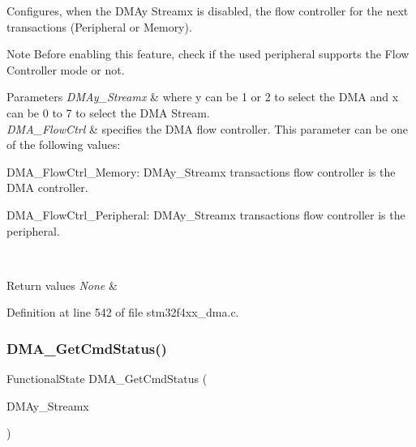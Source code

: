 Configures, when the D\+M\+Ay Streamx is disabled, the flow controller for the next transactions (Peripheral or Memory). 

\begin{DoxyNote}{Note}
Before enabling this feature, check if the used peripheral supports the Flow Controller mode or not.
\end{DoxyNote}

\begin{DoxyParams}{Parameters}
{\em D\+M\+Ay\+\_\+\+Streamx} & where y can be 1 or 2 to select the D\+MA and x can be 0 to 7 to select the D\+MA Stream. \\
\hline
{\em D\+M\+A\+\_\+\+Flow\+Ctrl} & specifies the D\+MA flow controller. This parameter can be one of the following values\+: \begin{DoxyItemize}
\item D\+M\+A\+\_\+\+Flow\+Ctrl\+\_\+\+Memory\+: D\+M\+Ay\+\_\+\+Streamx transactions flow controller is the D\+MA controller. \item D\+M\+A\+\_\+\+Flow\+Ctrl\+\_\+\+Peripheral\+: D\+M\+Ay\+\_\+\+Streamx transactions flow controller is the peripheral. \end{DoxyItemize}
\\
\hline
\end{DoxyParams}

\begin{DoxyRetVals}{Return values}
{\em None} & \\
\hline
\end{DoxyRetVals}


Definition at line 542 of file stm32f4xx\+\_\+dma.\+c.

\mbox{\label{group___d_m_a_gaa4d631cdd6cd020106435f30c0c6fb15}} 
\subsubsection{\texorpdfstring{D\+M\+A\+\_\+\+Get\+Cmd\+Status()}{DMA\_GetCmdStatus()}}
{\footnotesize\ttfamily Functional\+State D\+M\+A\+\_\+\+Get\+Cmd\+Status (\begin{DoxyParamCaption}\item[{\hyperlink{struct_d_m_a___stream___type_def}{D\+M\+A\+\_\+\+Stream\+\_\+\+Type\+Def} $\ast$}]{D\+M\+Ay\+\_\+\+Streamx }\end{DoxyParamCaption})}



